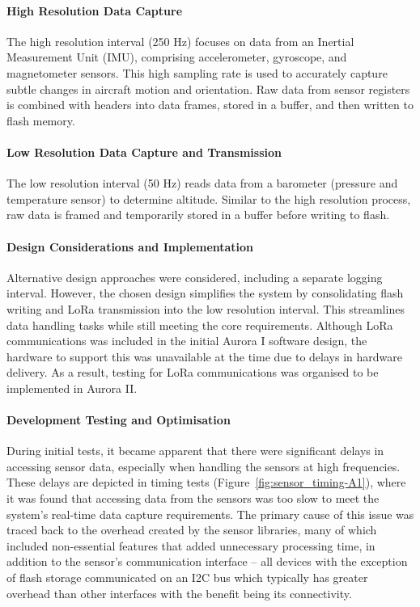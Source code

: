 \paragraph{High Resolution Data Capture}

The high resolution interval (250 Hz) focuses on data from an Inertial Measurement Unit (IMU), comprising accelerometer, gyroscope, and magnetometer sensors. This high sampling rate is used to accurately capture subtle changes in aircraft motion and orientation. Raw data from sensor registers is combined with headers into data frames, stored in a buffer, and then written to flash memory. 

\paragraph{Low Resolution Data Capture and Transmission}

The low resolution interval (50 Hz) reads data from a barometer (pressure and temperature sensor) to determine altitude. Similar to the high resolution process, raw data is framed and temporarily stored in a buffer before writing to flash.  

\paragraph{Design Considerations and Implementation}

Alternative design approaches were considered, including a separate logging interval. However, the chosen design simplifies the system by consolidating flash writing and LoRa transmission into the low resolution interval. This streamlines data handling tasks while still meeting the core requirements. Although LoRa communications was included in the initial Aurora I software design, the hardware to support this was unavailable at the time due to delays in hardware delivery. As a result, testing for LoRa communications was organised to be implemented in Aurora II. 

\paragraph{Development Testing and Optimisation}

During initial tests, it became apparent that there were significant delays in accessing sensor data, especially when handling the sensors at high frequencies. These delays are depicted in timing tests (Figure~\ref{fig:sensor_timing-A1}), where it was found that accessing data from the sensors was too slow to meet the system’s real-time data capture requirements. The primary cause of this issue was traced back to the overhead created by the sensor libraries, many of which included non-essential features that added unnecessary processing time, in addition to the sensor's communication interface -- all devices with the exception of flash storage communicated on an I2C bus which typically has greater overhead than other interfaces with the benefit being its connectivity. 


